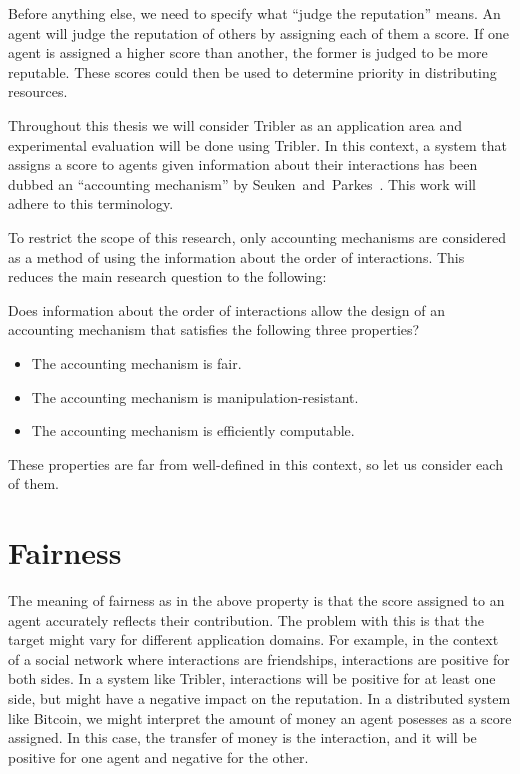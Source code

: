 \documentclass[a4paper,11pt]{book}
\theoremstyle{definition}
\begin{document}
Before anything else, we need to specify what ``judge the reputation'' means.
An agent will judge the reputation of others by assigning each of them a score.
If one agent is assigned a higher score than another, the former is judged to be more
reputable.  These scores could then be used to determine priority in distributing resources.

Throughout this thesis we will consider Tribler as an application area and experimental
evaluation will be done using Tribler. 
In this context, a system that assigns a score
to agents given information about their interactions has been dubbed an 
``accounting mechanism'' by Seuken~and~Parkes~\cite{seuken2010accounting}. This
work will adhere to this terminology.

To restrict the scope of this research, only accounting mechanisms are considered as a method
of using the information about the order of interactions. This reduces the main research question
to the following:

\begin{center}
    Does information about the order of interactions allow the design of an accounting mechanism
    that satisfies the following three properties?
\end{center}

\begin{itemize}
    \item The accounting mechanism is fair. 
    \item The accounting mechanism is manipulation-resistant.
    \item The accounting mechanism is efficiently computable.
\end{itemize}

These properties are far from well-defined in this context, so let us consider each of them.

\section{Fairness}

The meaning of fairness as in the above property is that the score assigned to an agent
accurately reflects their contribution. The problem with this is that the target might
vary for different application domains. For example, in the context of a social
network where interactions are friendships, interactions are positive for both sides.
In a system like Tribler, interactions will be positive for at least one side, but
might have a negative impact on the reputation. In a distributed system like Bitcoin,
we might interpret the amount of money an agent posesses as a score assigned. In
this case, the transfer of money is the interaction, and it will be positive for one
agent and negative for the other.
\end{document}
